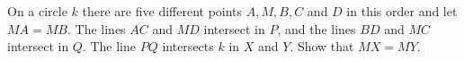On a circle $k$ there are five different points $A,M,B,C$ and $D$ in this order and let $MA = MB$.
The lines $AC$ and $MD$ intersect in $P$, and the lines $BD$ and $MC$ intersect in $Q$.
The line $PQ$ intersects $k$ in $X$ and $Y$. Show that $MX = MY$.